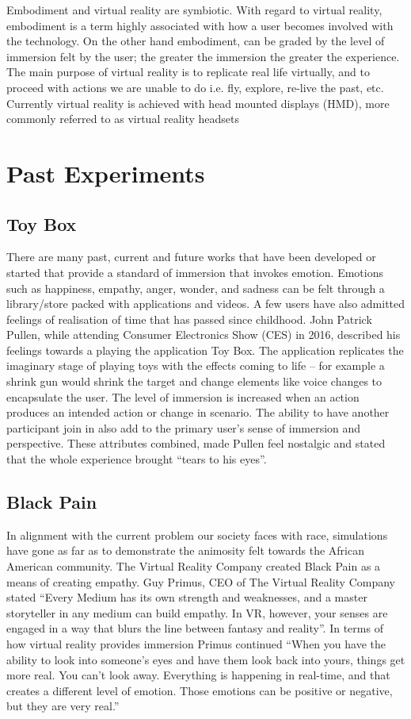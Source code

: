 \documentclass[12pt]{report}
\begin{document}
Embodiment and virtual reality are symbiotic. With regard to virtual reality, embodiment is a term highly associated with how a user becomes involved with the technology. On the other hand embodiment, can be graded by the level of immersion felt by the user; the greater the immersion the greater the experience. The main purpose of virtual reality is to replicate real life virtually, and to proceed with actions we are unable to do i.e. fly, explore, re-live the past, etc. 
Currently virtual reality is achieved with head mounted displays (HMD), more commonly referred to as virtual reality headsets

\section{Past Experiments}
\subsection{Toy Box}
There are many past, current and future works that have been developed or started that provide a standard of immersion that invokes emotion. Emotions such as happiness, empathy, anger, wonder, and sadness can be felt through a library/store packed with applications and videos.  A few users have also admitted feelings of realisation of time that has passed since childhood. John Patrick Pullen, while attending Consumer Electronics Show (CES) in 2016, described his feelings towards a playing the application Toy Box. The application replicates the imaginary stage of playing toys with the effects coming to life – for example a shrink gun would shrink the target and change elements like voice changes to encapsulate the user. The level of immersion is increased when an action produces an intended action or change in scenario. The ability to have another participant join in also add to the primary user’s sense of immersion and perspective. These attributes combined, made Pullen feel nostalgic and stated that the whole experience brought “tears to his eyes”.

\subsection{Black Pain}
In alignment with the current problem our society faces with race, simulations have gone as far as to demonstrate the animosity felt towards the African American community. The Virtual Reality Company created Black Pain as a means of creating empathy. Guy Primus, CEO of The Virtual Reality Company stated “Every Medium has its own strength and weaknesses, and a master storyteller in any medium can build empathy. In VR, however, your senses are engaged in a way that blurs the line between fantasy and reality”. In terms of how virtual reality provides immersion Primus continued “When you have the ability to look into someone’s eyes and have them look back into yours, things get more real. You can’t look away. Everything is happening in real-time, and that creates a different level of emotion. Those emotions can be positive or negative, but they are very real.”
\\
  
\end{document}

